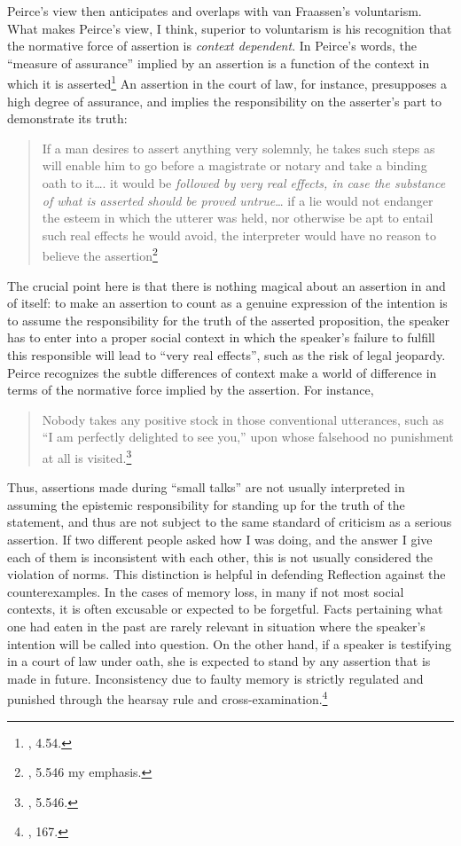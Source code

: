 Peirce's view then anticipates and overlaps with van Fraassen's
voluntarism. What makes Peirce's view, I think, superior to voluntarism
is his recognition that the normative force of assertion is
\emph{context dependent}. In Peirce's words, the ``measure of
assurance'' implied by an assertion is a function of the context in
which it is asserted\footnote{\cite{CP}, 4.54.} An assertion in the court of law, for
instance, presupposes a high degree of assurance, and implies the
responsibility on the asserter's part to demonstrate its truth:

\begin{quote}
If a man desires to assert anything very solemnly, he takes such steps
as will enable him to go before a magistrate or notary and take a
binding oath to it\ldots{}. it would be \emph{followed by very real
effects, in case the substance of what is asserted should be proved
untrue}\ldots{} if a lie would not endanger the esteem in which the
utterer was held, nor otherwise be apt to entail such real effects he
would avoid, the interpreter would have no reason to believe the
assertion\footnote{\cite{CP}, 5.546 my emphasis.}
\end{quote}

The crucial point here is that there is nothing magical about an
assertion in and of itself: to make an assertion to count as a genuine
expression of the intention is to assume the responsibility for the truth
of the asserted proposition, the speaker has to enter into a proper social
context in which the speaker's failure to fulfill this responsible will
lead to ``very real effects'', such as the risk of legal jeopardy. Peirce recognizes the subtle differences of context make a world of
difference in terms of the normative force implied by the assertion. For
instance,

\begin{quote}
Nobody takes any positive stock in those conventional utterances, such
as ``I am perfectly delighted to see you,'' upon whose falsehood no
punishment at all is visited.\footnote{\cite{CP}, 5.546.}
\end{quote}

Thus, assertions made during ``small talks'' are not usually interpreted in
assuming the epistemic responsibility for standing up for the truth of the statement, and thus are not subject to the
same standard of criticism as a serious assertion. If two different people asked how I was doing, and the answer I give each of them is inconsistent with each other, this is not usually considered the violation of norms. This distinction is
helpful in defending Reflection against the 
counterexamples. In the cases of memory loss, in many if not most social
contexts, it is often excusable or expected to be forgetful. Facts
pertaining what one had eaten in the past are rarely relevant in
situation where the speaker's intention will be called into question. On
the other hand, if a speaker is testifying in a court of law under oath,
she is expected to stand by any assertion that is made in future.
Inconsistency due to faulty memory is strictly regulated and punished
through the hearsay rule and cross-examination.\footnote{\cite{forgetful}, 167.}

